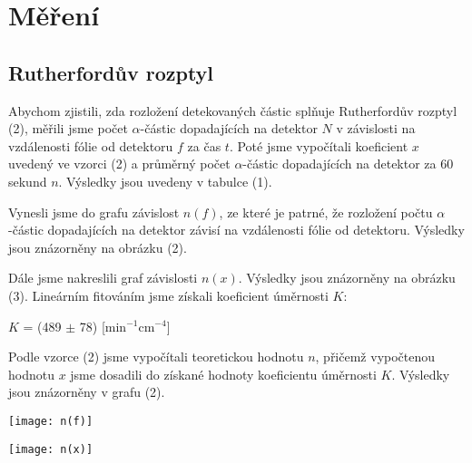 \documentclass[a4paper,11pt]{article}
\begin{document}
    \begin{minipage}[t]{0.5\textwidth} 
        \section{Měření}
            \subsection{Rutherfordův rozptyl}
                Abychom zjistili, zda rozložení detekovaných částic splňuje Rutherfordův rozptyl (2), měřili jsme počet $\alpha$-částic dopadajících na detektor $N$ v závislosti na vzdálenosti fólie od detektoru $f$ za čas $t$. Poté jsme vypočítali koeficient $x$ uvedený ve vzorci (2) a průměrný počet $\alpha$-částic dopadajících na detektor za 60 sekund $n$. Výsledky jsou uvedeny v tabulce (1).
                \par Vynesli jsme do grafu závislost $n(f)$, ze které je patrné, že rozložení počtu $\alpha$-částic dopadajících na detektor závisí na vzdálenosti fólie od detektoru. Výsledky jsou znázorněny na obrázku (2).
                \par Dále jsme nakreslili graf závislosti $n(x)$. Výsledky jsou znázorněny na obrázku (3). Lineárním fitováním jsme získali koeficient úměrnosti $K$: 
                \begin{center}
                    $K$ = (489 $\pm$ 78) [min$^{-1}$cm$^{-4}$]
                \end{center}
                
                Podle vzorce (2) jsme vypočítali teoretickou hodnotu $n$, přičemž vypočtenou hodnotu $x$ jsme dosadili do získané hodnoty koeficientu úměrnosti $K$. Výsledky jsou znázorněny v grafu (2). 

                \vspace{10pt}   
                \par \centering
                \texttt{[image: n(f)]}
                \captionsetup{justification=centering, font=footnotesize}
                \label{fig:n(f)}
                \vspace{10pt}
                \raggedright   

                \vspace{10pt}   
                \par \centering
                \texttt{[image: n(x)]}
                \captionsetup{justification=centering, font=footnotesize}
                \label{fig:n(x)}
                \vspace{10pt}
                \raggedright 
    \end{minipage}
\end{document}
